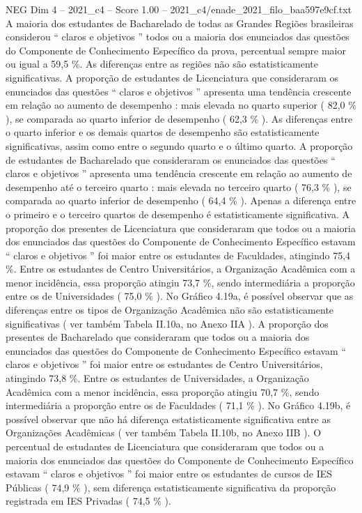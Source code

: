\begin{textsample}{NEG Dim 4 – 2021\_c4 – Score 1.00 – 2021\_c4/enade\_2021\_filo\_baa597e9cf.txt}
A maioria dos estudantes de Bacharelado de todas as Grandes Regiões brasileiras considerou “ claros e objetivos ” todos ou a maioria dos enunciados das questões do Componente de Conhecimento Específico da prova, percentual sempre maior ou igual a 59,5 \%.
As diferenças entre as regiões não são estatisticamente significativas.
A proporção de estudantes de Licenciatura que consideraram os enunciados das questões “ claros e objetivos ” apresenta uma tendência crescente em relação ao aumento de desempenho : mais elevada no quarto superior ( 82,0 \% ), se comparada ao quarto inferior de desempenho ( 62,3 \% ).
As diferenças entre o quarto inferior e os demais quartos de desempenho são estatisticamente significativas, assim como entre o segundo quarto e o último quarto.
A proporção de estudantes de Bacharelado que consideraram os enunciados das questões “ claros e objetivos ” apresenta uma tendência crescente em relação ao aumento de desempenho até o terceiro quarto : mais elevada no terceiro quarto ( 76,3 \% ), se comparada ao quarto inferior de desempenho ( 64,4 \% ).
Apenas a diferença entre o primeiro e o terceiro quartos de desempenho é estatisticamente significativa.
A proporção dos presentes de Licenciatura que consideraram que todos ou a maioria dos enunciados das questões do Componente de Conhecimento Específico estavam “ claros e objetivos ” foi maior entre os estudantes de Faculdades, atingindo 75,4 \%.
Entre os estudantes de Centro Universitários, a Organização Acadêmica com a menor incidência, essa proporção atingiu 73,7 \%, sendo intermediária a proporção entre os de Universidades ( 75,0 \% ).
No Gráfico 4.19a, é possível observar que as diferenças entre os tipos de Organização Acadêmica não são estatisticamente significativas ( ver também Tabela II.10a, no Anexo IIA ).
A proporção dos presentes de Bacharelado que consideraram que todos ou a maioria dos enunciados das questões do Componente de Conhecimento Específico estavam “ claros e objetivos ” foi maior entre os estudantes de Centro Universitários, atingindo 73,8 \%.
Entre os estudantes de Universidades, a Organização Acadêmica com a menor incidência, essa proporção atingiu 70,7 \%, sendo intermediária a proporção entre os de Faculdades ( 71,1 \% ).
No Gráfico 4.19b, é possível observar que não há diferença estatisticamente significativa entre as Organizações Acadêmicas ( ver também Tabela II.10b, no Anexo IIB ).
O percentual de estudantes de Licenciatura que consideraram que todos ou a maioria dos enunciados das questões do Componente de Conhecimento Específico estavam “ claros e objetivos ” foi maior entre os estudantes de cursos de IES Públicas ( 74,9 \% ), sem diferença estatisticamente significativa da proporção registrada em IES Privadas ( 74,5 \% ).

\end{textsample}
